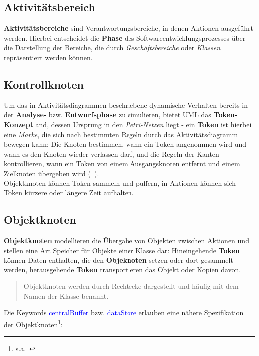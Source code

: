 \subsection{Aktivitätsbereich}
\textbf{Aktivitätsbereiche} sind Verantwortungsbereiche, in denen Aktionen ausgeführt werden.
Hierbei entscheidet die \textbf{Phase} des Softwareentwicklungsprozesses über die Darstellung der Bereiche, die durch \textit{Geschäftsbereiche} oder \textit{Klassen} repräsentiert werden können.

\subsection{Kontrollknoten}
Um das in Aktivitätsdiagrammen beschriebene dynamische Verhalten bereits in der \textbf{Analyse-} bzw. \textbf{Entwurfsphase} zu simulieren, bietet UML das \textbf{Token-Konzept} and, dessen Ursprung in den \textit{Petri-Netzen} liegt - ein \textbf{Token} ist hierbei eine \textit{Marke}, die sich nach bestimmten Regeln durch das Aktivitätsdiagramm bewegen kann: Die Knoten bestimmen, wann ein Token angenommen wird und wann es den Knoten wieder verlassen darf, und die Regeln der Kanten kontrollieren, wann ein Token von einem Ausgangsknoten entfernt und einem Zielknoten übergeben wird (~\cite[323]{Bal05}).\\
Objektknoten können Token sammeln und puffern, in Aktionen können sich Token kürzere oder längere Zeit aufhalten.\\

\subsection{Objektknoten}


\textbf{Objektknoten} modellieren die Übergabe von Objekten zwischen Aktionen und stellen eine Art Speicher für Objekte einer Klasse dar: Hineingehende \textbf{Token} können Daten enthalten, die den \textbf{Objeknoten} setzen oder dort gesammelt werden, herausgehende \textbf{Token} transportieren das Objekt oder Kopien davon.\\

\blockquote[{\cite[73]{Bal05}}]{
    Objektknoten werden durch Rechtecke dargestellt und häufig mit dem Namen der Klasse benannt.
}

Die Keywords \textcolor{blue}{\guillemotleft centralBuffer\guillemotright} bzw. \textcolor{blue}{\guillemotleft dataStore\guillemotright} erlauben eine nähere Spezifikation der Objektknoten\footnote{s.a.~\cite[398 f.]{OMG17}}:

